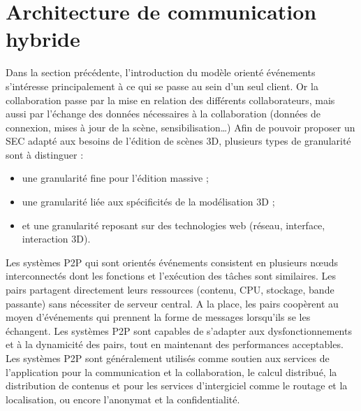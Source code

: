 \section{Architecture de communication hybride}


Dans la section précédente, l'introduction du modèle orienté événements 
s'intéresse principalement à ce qui se passe au sein d'un seul client. 
Or la collaboration passe par la mise en relation des différents collaborateurs, mais aussi par  
l'échange des données nécessaires à la collaboration (données de connexion, 
mises à jour de la scène, sensibilisation\dots)
Afin de pouvoir proposer un \gls{SEC} adapté aux besoins de l'édition de scènes 
3D, plusieurs types de granularité sont à distinguer : 
\begin{itemize}
	\item une granularité fine pour l'édition massive ;
	\item une granularité liée aux spécificités de la modélisation \gls{3D} ;
	\item et une granularité reposant sur des technologies web (réseau, interface, 
	interaction \gls{3D}).
\end{itemize}

Les systèmes \gls{P2P} qui sont orientés événements consistent en plusieurs 
n\oe uds interconnectés dont les fonctions et l'exécution des tâches sont
similaires. Les pairs partagent directement leurs ressources (contenu, CPU, 
stockage, bande passante) sans nécessiter de serveur central. A la place, les 
pairs coopèrent au moyen d'événements qui prennent la forme de messages lorsqu'ils
se les échangent. Les systèmes \gls{P2P} sont capables de s'adapter aux 
dysfonctionnements et à la dynamicité des pairs, tout en maintenant des 
performances acceptables. Les systèmes \gls{P2P} sont généralement utilisés 
comme soutien aux services de l'application pour la communication et la 
collaboration, le calcul distribué, la distribution de contenus et pour les services 
d'intergiciel comme le routage et la localisation, ou encore l'anonymat et la confidentialité.

